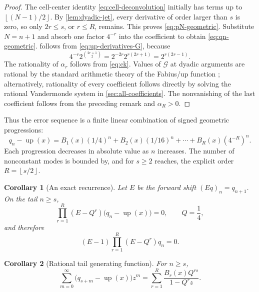 \documentclass[11pt]{article}
\newtheorem{corollary}[corollary]{Corollary}
\theoremstyle{definition}
\theoremstyle{remark}
\newcommand{\rv}{\operatorname{up}}
\newcommand{\Global}{\mathcal G}
\newcommand{\floor}[1]{\left\lfloor #1\right\rfloor}
\begin{document}
\begin{proof}
The cell-center identity \cref{eq:cell-deconvolution} initially has terms up
to \(\floor{(N-1)/2}\).  By \cref{lem:dyadic-jet}, every derivative of order
larger than \(s\) is zero, so only \(2r\le s\), or \(r\le R\), remains.  This
proves \cref{eq:pN-geometric}.  Substitute \(N=n+1\) and absorb one factor
\(4^{-r}\) into the coefficient to obtain \cref{eq:qn-geometric}.
 follows from
\cref{eq:up-derivatives-G}, because
\[
 4^{-r}2^{\binom{2r+1}{2}}
 =2^{-2r}2^{r(2r+1)}=2^{r(2r-1)}.
\]
The rationality of \(\alpha_r\) follows from \cref{eq:ck}.  Values of
\(\Global\) at dyadic arguments are rational by the standard arithmetic theory
of the Fabius/up function \cite{arias2018,proveit-primary}; alternatively,
rationality of every coefficient follows directly by solving the rational
Vandermonde system in \cref{sec:all-coefficients}.  The nonvanishing of the
last coefficient follows from the preceding remark and \(\alpha_R>0\).
\end{proof}

Thus the error sequence is a finite linear combination of signed geometric
progressions:
\begin{equation}
 q_n-\rv(x)=B_1(x)(1/4)^n+B_2(x)(1/16)^n+\cdots+B_R(x)(4^{-R})^n.
 \label{eq:signed-progressions}
\end{equation}
Each progression decreases in absolute value as \(n\) increases.  The number
of nonconstant modes is bounded by, and for \(s\ge2\) reaches, the explicit
order \(R=\floor{s/2}\).

\begin{corollary}[An exact recurrence]
\label{cor:recurrence}
Let \(E\) be the forward shift \((Eq)_n=q_{n+1}\).  On the tail \(n\ge s\),
\begin{equation}
 \prod_{r=1}^{R}(E-Q^r)\bigl(q_n-\rv(x)\bigr)=0,
 \qquad Q=\frac14,
 \label{eq:error-recurrence}
\end{equation}
and therefore
\begin{equation}
 (E-1)\prod_{r=1}^{R}(E-Q^r)q_n=0.
 \label{eq:q-recurrence}
\end{equation}
\end{corollary}

\begin{corollary}[Rational tail generating function]
For \(n\ge s\),
\begin{equation}
 \sum_{m=0}^{\infty}\bigl(q_{s+m}-\rv(x)\bigr)z^m
 =\sum_{r=1}^{R}\frac{B_r(x)Q^{rs}}{1-Q^rz}.
 \label{eq:tail-generating-function}
\end{equation}
\end{corollary}
\end{document}
